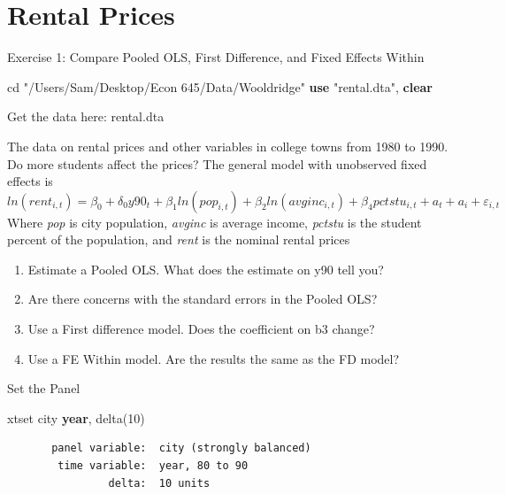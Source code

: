\documentclass[
]{book}
\newenvironment{Shaded}{\begin{snugshade}}{\end{snugshade}}
\newcommand{\FunctionTok}[1]{\textcolor[rgb]{0.13,0.29,0.53}{\textbf{#1}}}
\newcommand{\KeywordTok}[1]{\textcolor[rgb]{0.13,0.29,0.53}{\textbf{#1}}}
\newcommand{\NormalTok}[1]{#1}
\newcommand{\StringTok}[1]{\textcolor[rgb]{0.31,0.60,0.02}{#1}}
\providecommand{\tightlist}{%
  \setlength{\itemsep}{0pt}\setlength{\parskip}{0pt}}
\begin{document}
\section{Rental Prices}\label{rental-prices}

Exercise 1: Compare Pooled OLS, First Difference, and Fixed Effects Within

\begin{Shaded}
\begin{Highlighting}[]
\NormalTok{cd }\StringTok{"/Users/Sam/Desktop/Econ 645/Data/Wooldridge"}
\KeywordTok{use} \StringTok{"rental.dta"}\NormalTok{, }\KeywordTok{clear}
\end{Highlighting}
\end{Shaded}

Get the data here: rental.dta

The data on rental prices and other variables in college towns from 1980 to 1990. Do more students affect the prices? The general model with unobserved fixed effects is
\[ ln(rent_{i,t}) = \beta_0 + \delta_0 y90_t + \beta_1 ln(pop_{i,t})+\beta_2 ln(avginc_{i,t})+\beta_4 pctstu_{i,t} + a_t + a_i + \varepsilon_{i,t} \]
Where \emph{pop} is city population, \emph{avginc} is average income, \emph{pctstu} is the student percent of the population, and \emph{rent} is the nominal rental prices

\begin{enumerate}
\def\labelenumi{\arabic{enumi}.}
\tightlist
\item
  Estimate a Pooled OLS. What does the estimate on y90 tell you?
\item
  Are there concerns with the standard errors in the Pooled OLS?
\item
  Use a First difference model. Does the coefficient on b3 change?
\item
  Use a FE Within model. Are the results the same as the FD model?
\end{enumerate}

Set the Panel

\begin{Shaded}
\begin{Highlighting}[]
\NormalTok{xtset city }\FunctionTok{year}\NormalTok{, delta(10)}
\end{Highlighting}
\end{Shaded}

\begin{verbatim}
       panel variable:  city (strongly balanced)
        time variable:  year, 80 to 90
                delta:  10 units
\end{verbatim}
\end{document}
